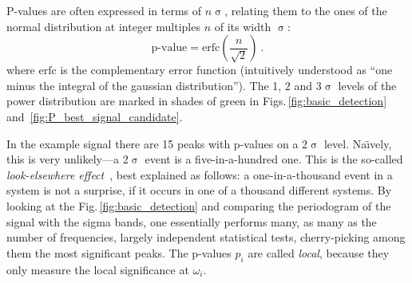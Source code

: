 
P-values are often expressed in terms of $n\upsigma$, relating them to the ones of the normal distribution at integer multiples $n$ of its width $\upsigma$:
\begin{equation}
  \text{p-value} = \mathrm{erfc}\left( \frac{n}{\sqrt{2}} \right)\ .
\end{equation}
where $\mathrm{erfc}$ is the complementary error function (intuitively understood as ``one minus the integral of the gaussian distribution''). The 1, 2 and 3$\upsigma$ levels of the power distribution are marked in shades of green in Figs.\,\ref{fig:basic_detection} and~\ref{fig:P_best_signal_candidate}.

In the example signal there are 15 peaks with p-values on a 2$\upsigma$ level. Na\"\i vely, this is very unlikely---a 2$\upsigma$ event is a five-in-a-hundred one. This is the so-called \emph{look-elsewhere effect}~\cite{PDG2016}, best explained as follows: a one-in-a-thousand event in a system is not a surprise, if it occurs in one of a thousand different systems. By looking at the Fig.\,\ref{fig:basic_detection} and comparing the periodogram of the signal with the sigma bands, one essentially performs many, as many as the number of frequencies, largely independent statistical tests, cherry-picking among them the most significant peaks. The p-values $p_i$ are called \emph{local}, because they only measure the local significance at $\omega_i$.

